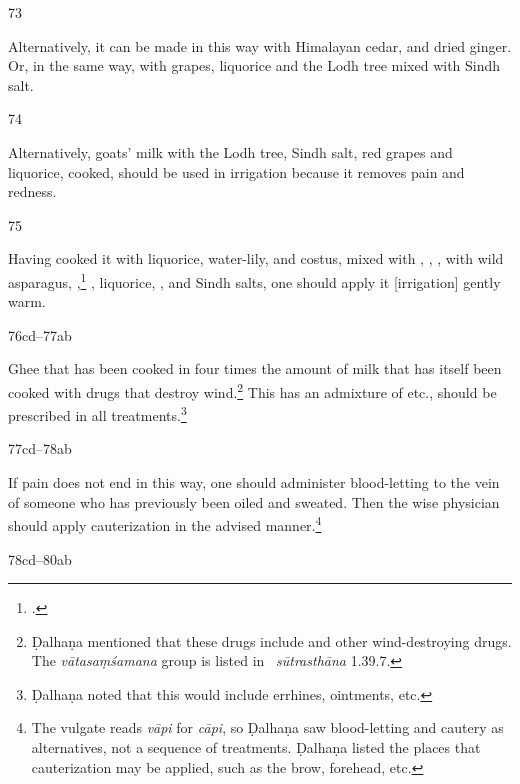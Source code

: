\begin{translation}
    \item[73]
    
    Alternatively, it can be made in this way with Himalayan cedar,  and dried 
    ginger.
    Or, in the same way, with grapes, liquorice and the Lodh tree mixed with Sindh salt.
    
    \item[74]
    
    Alternatively, goats' milk with the Lodh tree, Sindh salt, red grapes and liquorice, cooked, 
    should be used in irrigation because it removes pain and redness. 
    
    \item[75]
    
    Having cooked it with liquorice, water-lily, and costus, mixed with ,
    ,
    , 
    with wild asparagus, ,\footcite[18]{suve-2000}
    ,
    liquorice,
    ,
    and Sindh salts, 
    one should apply it [irrigation] gently warm.
    
    
    \item[76cd--77ab]
    
    Ghee that has been cooked in four times the amount of milk that has itself
been cooked with drugs that destroy wind.\footnote{Ḍalhaṇa mentioned that these
drugs include  and other wind-destroying drugs.  The
\emph{vātasaṃśamana} group is listed in \SS\ \emph{sūtrasthāna} 1.39.7.}
This has an admixture of  etc., should be
prescribed in all treatments.\footnote{Ḍalhaṇa noted that this would include
errhines, ointments, etc.}
    
    \item[77cd--78ab]
    
    If pain does not end in this way, one should administer blood-letting to the vein of 
    someone who has previously been oiled and sweated.  Then the wise physician should 
    apply cauterization in the advised manner.\footnote{The vulgate reads \emph{vāpi} for 
    \emph{cāpi}, so Ḍalhaṇa saw blood-letting and cautery as alternatives, not a sequence of 
    treatments.  Ḍalhaṇa listed the places that cauterization may be applied, such as  the 
    brow, 
    forehead, etc.}
    
    \item[78cd--80ab]
    

\end{translation}
